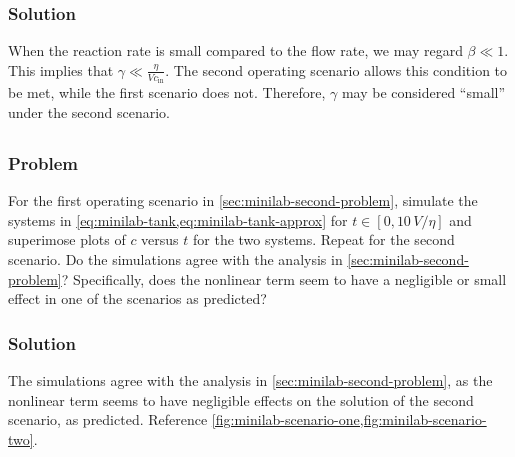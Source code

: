 \documentclass[12pt]{article}
\begin{document}
\subsubsection*{Solution}
When the reaction rate is small compared to the flow rate, we may regard $\beta
\ll 1$. This implies that $\gamma \ll \frac{\eta}{Vc_\text{in}}$. The second
operating scenario allows this condition to be met, while the first scenario
does not. Therefore, $\gamma$ may be considered ``small'' under the second
scenario.

\subsection{}
\subsubsection*{Problem}
For the first operating scenario in \cref{sec:minilab-second-problem}, simulate
the systems in \cref{eq:minilab-tank,eq:minilab-tank-approx} for
$t\in[0,10\,V/\eta]$ and superimose plots of $c$ versus $t$ for the two systems.
Repeat for the second scenario. Do the simulations agree with the analysis in
\cref{sec:minilab-second-problem}? Specifically, does the nonlinear term seem
to have a negligible or small effect in one of the scenarios as predicted?

\subsubsection*{Solution}
The simulations agree with the analysis in \cref{sec:minilab-second-problem}, as
the nonlinear term seems to have negligible effects on the solution of the
second scenario, as predicted. Reference
\cref{fig:minilab-scenario-one,fig:minilab-scenario-two}.
\end{document}
